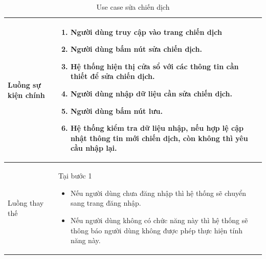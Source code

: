 \documentclass[12pt,a4paper]{article}
\begin{document}
\begin{table}[H]
\begin{tabular}{|p{3.5cm}|p{11.5cm}|c|}
            Luồng sự kiện chính & \vspace{-.8cm}\begin{enumerate}
                                                    \item Người dùng truy cập vào trang chiến dịch
                                                    \item  Người dùng bấm nút sửa chiến dịch.
                                                    \item  Hệ thống hiện thị cửa sổ với các thông tin cần thiết để sửa chiến dịch.
                                                    \item  Người dùng nhập dữ liệu cần sửa chiến dịch.
                                                    \item Người dùng bấm nút lưu.
                                                    \item Hệ thống kiểm tra dữ liệu nhập, nếu hợp lệ cập nhật thông tin mới chiến dịch, còn không thì yêu cầu nhập lại.
            \end{enumerate}
            \\
            \hline
            Luồng thay thế & Tại bước 1\newline
            \vspace{-.8cm}\begin{itemize}
                              \item Nếu người dùng chưa đăng nhập thì hệ thống sẽ chuyển sang trang đăng nhập.
                              \item  Nếu người dùng không có chức năng này thì hệ thống sẽ thông báo người dùng không được phép thực hiện tính năng này.
            \end{itemize}
            \\
            \hline
        \end{tabular}
        \caption{Use case sửa chiến dịch }
    \end{table}


\end{document}
